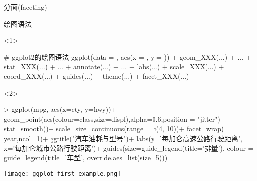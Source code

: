 \begin{frame}[t,fragile]{\subsecname}{分面(faceting)}
\begin{overlayarea}{\textwidth}{\textheight}
\end{overlayarea}
\end{frame}

\begin{frame}[t,fragile]{\subsecname}{绘图语法}
\begin{overlayarea}{\textwidth}{\textheight}
\begin{onlyenv}<1>
\begin{rcode}
# ggplot2的绘图语法 
ggplot(data = , aes(x = , y = )) + geom_XXX(...) + ... + stat_XXX(...) + ... + annotate(...) + ... + labs(...) + scale_XXX(...) + coord_XXX(...) + guides(...) + theme(...) + facet_XXX(...)
\end{rcode}
\end{onlyenv}

\begin{onlyenv}<2>
\begin{minipage}{\textwidth}
\begin{rcode}
> ggplot(mpg, aes(x=cty, y=hwy))+   
  geom_point(aes(colour=class,size=displ),alpha=0.6,position = "jitter")+  
  stat_smooth()+  
  scale_size_continuous(range = c(4, 10))+  
  facet_wrap(~ year,ncol=1)+  
  ggtitle("汽车油耗与型号")+  
  labs(y='每加仑高速公路行驶距离',  
       x='每加仑城市公路行驶距离')+  
  guides(size=guide_legend(title='排量'), colour = guide_legend(title='车型', override.aes=list(size=5))) 
\end{rcode} 
\end{minipage}

\begin{minipage}{\textwidth}
\centering
\texttt{[image: ggplot\_first\_example.png]}
\end{minipage}
\end{onlyenv}
\end{overlayarea}
\end{frame}


